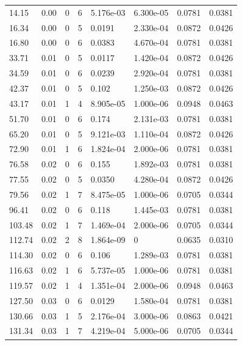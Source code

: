 \documentclass[preview]{standalone}
\begin{document}
{{\begin{tabular}{L{1.2cm}C{1.2cm} C{0.3cm}C{0.5cm} C{1.4cm}C{1.4cm} C{1.4cm}C{1.4cm}}
  14.15  &  0.00  & 0     &  6 &  5.176e-03  & 6.300e-05  & 0.0781 &  0.0381   \\ 
  16.34  &  0.00  & 0     &  5 &  0.0191  & 2.330e-04  & 0.0872 &  0.0426   \\ 
  16.80  &  0.00  & 0     &  6 &  0.0383  & 4.670e-04  & 0.0781 &  0.0381   \\ 
  33.71  &  0.01  & 0     &  5 &  0.0117  & 1.420e-04  & 0.0872 &  0.0426   \\ 
  34.59  &  0.01  & 0     &  6 &  0.0239  & 2.920e-04  & 0.0781 &  0.0381   \\ 
  42.37  &  0.01  & 0     &  5 &  0.102  & 1.250e-03  & 0.0872 &  0.0426   \\ 
  43.17  &  0.01  & 1     &  4 &  8.905e-05  & 1.000e-06  & 0.0948 &  0.0463   \\ 
  51.70  &  0.01  & 0     &  6 &  0.174  & 2.131e-03  & 0.0781 &  0.0381   \\ 
  65.20  &  0.01  & 0     &  5 &  9.121e-03  & 1.110e-04  & 0.0872 &  0.0426   \\ 
  72.90  &  0.01  & 1     &  6 &  1.824e-04  & 2.000e-06  & 0.0781 &  0.0381   \\ 
  76.58  &  0.02  & 0     &  6 &  0.155  & 1.892e-03  & 0.0781 &  0.0381   \\ 
  77.55  &  0.02  & 0     &  5 &  0.0350  & 4.280e-04  & 0.0872 &  0.0426   \\ 
  79.56  &  0.02  & 1     &  7 &  8.475e-05  & 1.000e-06  & 0.0705 &  0.0344   \\ 
  96.41  &  0.02  & 0     &  6 &  0.118  & 1.445e-03  & 0.0781 &  0.0381   \\ 
  103.48  &  0.02  & 1     &  7 &  1.469e-04  & 2.000e-06  & 0.0705 &  0.0344   \\ 
  112.74  &  0.02  & 2     &  8 &  1.864e-09  & 0  & 0.0635 &  0.0310   \\ 
  114.30  &  0.02  & 0     &  6 &  0.106  & 1.289e-03  & 0.0781 &  0.0381   \\ 
  116.63  &  0.02  & 1     &  6 &  5.737e-05  & 1.000e-06  & 0.0781 &  0.0381   \\ 
  119.57  &  0.02  & 1     &  4 &  1.351e-04  & 2.000e-06  & 0.0948 &  0.0463   \\ 
  127.50  &  0.03  & 0     &  6 &  0.0129  & 1.580e-04  & 0.0781 &  0.0381   \\ 
  130.66  &  0.03  & 1     &  5 &  2.176e-04  & 3.000e-06  & 0.0863 &  0.0421   \\ 
  131.34  &  0.03  & 1     &  7 &  4.219e-04  & 5.000e-06  & 0.0705 &  0.0344   \\ 

\end{tabular}}}
\end{document}
